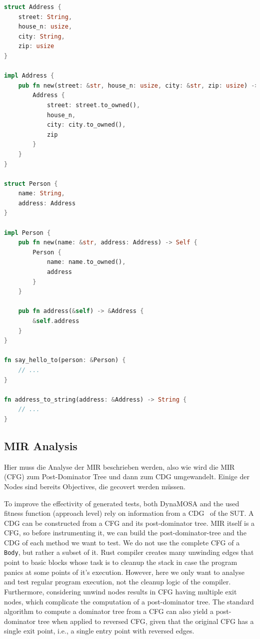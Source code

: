 \documentclass{article}
\begin{document}
\begin{lstlisting}[language=Rust, style=boxed, caption={After HIR analysis, we know how a \lstinline{Person} object can be generated to be used in \lstinline{say_hello_to}.}, label=lst:hir-analysis-example]
struct Address {
    street: String,
    house_n: usize,
    city: String,
    zip: usize
}

impl Address {
    pub fn new(street: &str, house_n: usize, city: &str, zip: usize) -> Self {
        Address {
            street: street.to_owned(),
            house_n,
            city: city.to_owned(),
            zip
        }
    }
}

struct Person {
    name: String,
    address: Address
}

impl Person {
    pub fn new(name: &str, address: Address) -> Self {
        Person {
            name: name.to_owned(),
            address
        }
    }

    pub fn address(&self) -> &Address {
        &self.address
    }
}

fn say_hello_to(person: &Person) {
    // ...
}

fn address_to_string(address: &Address) -> String {
    // ...
}
\end{lstlisting}

\subsection{MIR Analysis}
Hier muss die Analyse der MIR beschrieben werden, also wie wird die MIR (CFG) zum Post-Dominator Tree und dann zum CDG umgewandelt. Einige der Nodes sind bereits Objectives, die gecovert werden müssen.

To improve the effectivity of generated tests, both DynaMOSA and the used fitness function (approach level) rely on information from a \ac{CDG}~\cite{Ferrante1987} of the \ac{SUT}. A \ac{CDG} can be constructed from a \ac{CFG} and its post-dominator tree. \ac{MIR} itself is a \ac{CFG}, so before instrumenting it, we can build the post-dominator-tree and the \ac{CDG} of each method we want to test. We do not use the complete \ac{CFG} of a \lstinline{Body}, but rather a subset of it. Rust compiler creates many unwinding edges that point to basic blocks whose task is to cleanup the stack in case the program panics at some points of it's execution. However, here we only want to analyse and test regular program execution, not the cleanup logic of the compiler. Furthermore, considering unwind nodes results in \ac{CFG} having multiple exit nodes, which complicate the computation of a post-dominator tree. The standard algorithm to compute a dominator tree from a \ac{CFG} can also yield a post-dominator tree when applied to reversed \ac{CFG}, given that the original \ac{CFG} has a single exit point, i.e., a single entry point with reversed edges.
\end{document}
